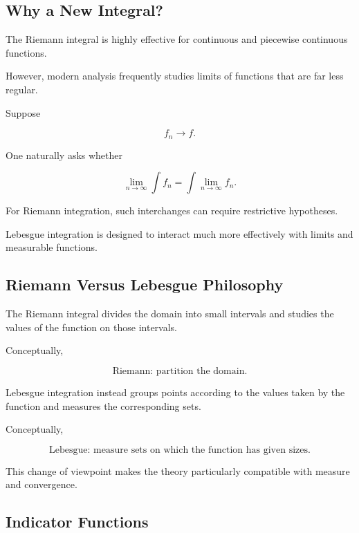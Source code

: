 \subsection{Why a New Integral?}
\label{subsec:why-lebesgue-integral}

The Riemann integral is highly effective for continuous and piecewise
continuous functions.

However, modern analysis frequently studies limits of functions that are
far less regular.

Suppose

\[
f_n\to f.
\]

One naturally asks whether

\[
\boxed{
\lim_{n\to\infty}\int f_n
=
\int\lim_{n\to\infty}f_n.
}
\]

For Riemann integration, such interchanges can require restrictive
hypotheses.

Lebesgue integration is designed to interact much more effectively with
limits and measurable functions.

\subsection{Riemann Versus Lebesgue Philosophy}
\label{subsec:riemann-versus-lebesgue-philosophy}

The Riemann integral divides the domain into small intervals and studies
the values of the function on those intervals.

Conceptually,

\[
\boxed{
\text{Riemann: partition the domain.}
}
\]

Lebesgue integration instead groups points according to the values taken
by the function and measures the corresponding sets.

Conceptually,

\[
\boxed{
\text{Lebesgue: measure sets on which the function has given sizes.}
}
\]

This change of viewpoint makes the theory particularly compatible with
measure and convergence.

\subsection{Indicator Functions}
\label{subsec:indicator-functions-lebesgue}

